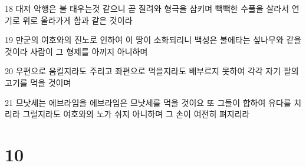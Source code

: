 \par 18 대저 악행은 불 태우는것 같으니 곧 질려와 형극을 삼키며 빽빽한 수풀을 살라서 연기로 위로 올라가게 함과 같은 것이라
\par 19 만군의 여호와의 진노로 인하여 이 땅이 소화되리니 백성은 불에타는 섶나무와 같을 것이라 사람이 그 형제를 아끼지 아니하며
\par 20 우편으로 움킬지라도 주리고 좌편으로 먹을지라도 배부르지 못하여 각각 자기 팔의 고기를 먹을 것이며
\par 21 므낫세는 에브라임을 에브라임은 므낫세를 먹을 것이요 또 그들이 합하여 유다를 치리라 그럴지라도 여호와의 노가 쉬지 아니하며 그 손이 여전히 펴지리라

\chapter{10}

